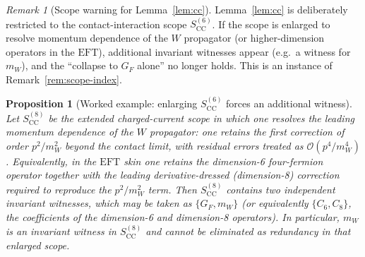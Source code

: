 \documentclass[11pt]{article}
\newtheorem{proposition}[definition]{Proposition}
\theoremstyle{remark}
\newtheorem{remark}[definition]{Remark}
\newcommand{\EFT}{\ensuremath{\mathrm{EFT}}}
\newcommand{\CC}{\ensuremath{\mathrm{CC}}}
\newcommand{\cO}{\mathcal{O}}
\begin{document}
\begin{remark}[Scope warning for Lemma~\ref{lem:cc}]\label{rem:cc-scope}
Lemma~\ref{lem:cc} is deliberately restricted to the contact-interaction scope $S_{\CC}^{(6)}$.
If the scope is enlarged to resolve momentum dependence of the $W$ propagator (or higher-dimension
operators in the $\EFT$), additional invariant witnesses appear (e.g.\ a witness for $m_W$),
and the ``collapse to $G_F$ alone'' no longer holds. This is an instance of
Remark~\ref{rem:scope-index}.
\end{remark}

\begin{proposition}[Worked example: enlarging $S_{\CC}^{(6)}$ forces an additional witness]\label{prop:cc-p2}
Let $S_{\CC}^{(8)}$ be the \emph{extended charged-current scope} in which one resolves the leading
momentum dependence of the $W$ propagator: one retains the first correction of order $p^2/m_W^2$
beyond the contact limit, with residual errors treated as $\cO(p^4/m_W^4)$.
Equivalently, in the $\EFT$ skin one retains the dimension-6 four-fermion operator together with the
leading derivative-dressed (dimension-8) correction required to reproduce the $p^2/m_W^2$ term.
Then $S_{\CC}^{(8)}$ contains \emph{two} independent invariant witnesses, which may be taken as
$\{G_F,m_W\}$ (or equivalently $\{C_6,C_8\}$, the coefficients of the dimension-6 and dimension-8 operators).
In particular, $m_W$ is an invariant witness in $S_{\CC}^{(8)}$ and cannot be eliminated as redundancy in
that enlarged scope.
\end{proposition}
\end{document}
